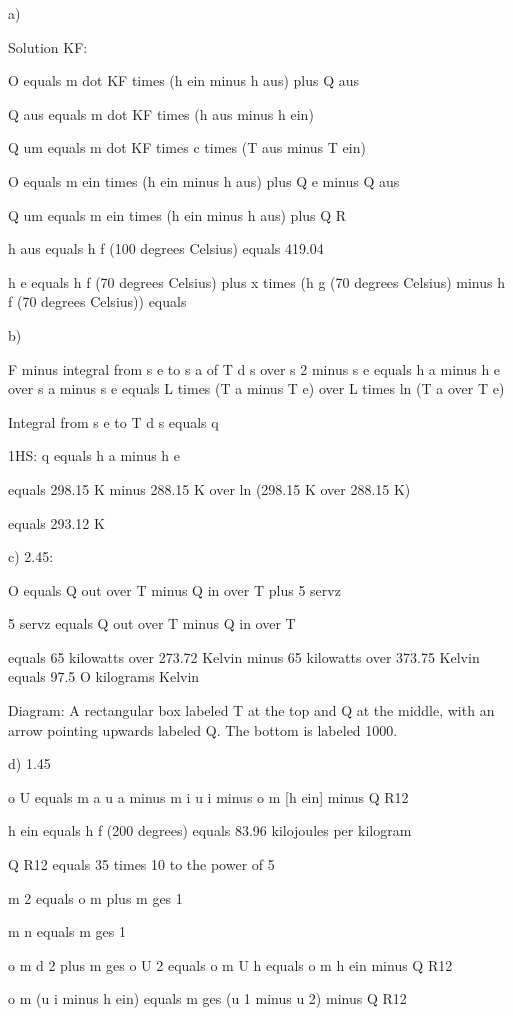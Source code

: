 a)

Solution KF:

O equals m dot KF times (h ein minus h aus) plus Q aus

Q aus equals m dot KF times (h aus minus h ein)

Q um equals m dot KF times c times (T aus minus T ein)

O equals m ein times (h ein minus h aus) plus Q e minus Q aus

Q um equals m ein times (h ein minus h aus) plus Q R

h aus equals h f (100 degrees Celsius) equals 419.04

h e equals h f (70 degrees Celsius) plus x times (h g (70 degrees Celsius) minus h f (70 degrees Celsius)) equals

b)

F minus integral from s e to s a of T d s over s 2 minus s e equals h a minus h e over s a minus s e equals L times (T a minus T e) over L times ln (T a over T e)

Integral from s e to T d s equals q

1HS: q equals h a minus h e

equals 298.15 K minus 288.15 K over ln (298.15 K over 288.15 K)

equals 293.12 K

c) 2.45: 

O equals Q out over T minus Q in over T plus 5 servz

5 servz equals Q out over T minus Q in over T

equals 65 kilowatts over 273.72 Kelvin minus 65 kilowatts over 373.75 Kelvin equals 97.5 O kilograms Kelvin

Diagram: A rectangular box labeled T at the top and Q at the middle, with an arrow pointing upwards labeled Q. The bottom is labeled 1000.

d) 1.45

o U equals m a u a minus m i u i minus o m [h ein] minus Q R12

h ein equals h f (200 degrees) equals 83.96 kilojoules per kilogram

Q R12 equals 35 times 10 to the power of 5

m 2 equals o m plus m ges 1

m n equals m ges 1

o m d 2 plus m ges o U 2 equals o m U h equals o m h ein minus Q R12

o m (u i minus h ein) equals m ges (u 1 minus u 2) minus Q R12

